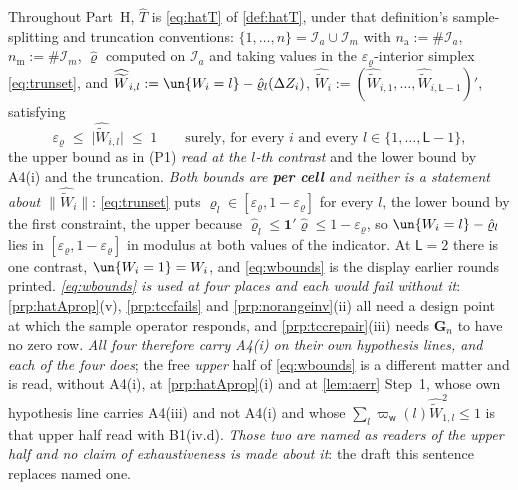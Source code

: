 \begin{definition}\label{def:hatTexp}
Throughout Part~H, $\hat T$ is \eqref{eq:hatT} of \cref{def:hatT}, under that definition's
sample-splitting and truncation conventions: $\{1,\dots,n\}=\mathcal I_a\cup\mathcal I_m$ with
$n_{\mathrm a}:=\#\mathcal I_a$, $n_{\mathrm m}:=\#\mathcal I_m$, $\hat\varrho$ computed on
$\mathcal I_a$ and taking values in the $\varepsilon_\varrho$-interior simplex \eqref{eq:trunset}, and
$\widehat{\widetilde W}_{i,l}:=\un\{W_i=l\}-\hat\varrho_l(\Delta Z_i)$,
$\widehat{\widetilde W}_i:=(\widehat{\widetilde W}_{i,1},\dots,\widehat{\widetilde W}_{i,\mathsf L-1})'$,
satisfying
\begin{equation}\label{eq:wbounds}
\varepsilon_\varrho\;\le\;\big|\widehat{\widetilde W}_{i,l}\big|\;\le\;1
\qquad\text{surely, for every }i\text{ and every }l\in\{1,\dots,\mathsf L-1\} ,
\end{equation}
the upper bound as in (P1) \emph{read at the $l$-th contrast} and the lower bound by A4(i) and the
truncation. \emph{Both bounds are \textbf{per cell} and neither is a statement about
$\|\widehat{\widetilde W}_i\|$}: \eqref{eq:trunset} puts $\hat\varrho_l\in[\varepsilon_\varrho,1-\varepsilon_\varrho]$
for every $l$, the lower bound by the first constraint, the upper because
$\hat\varrho_l\le\mathbf 1'\hat\varrho\le1-\varepsilon_\varrho$, so
$\un\{W_i=l\}-\hat\varrho_l$ lies in $[\varepsilon_\varrho,1-\varepsilon_\varrho]$ in modulus at both
values of the indicator. At $\mathsf L=2$ there is one contrast, $\un\{W_i=1\}=W_i$, and
\eqref{eq:wbounds} is the display earlier rounds printed.
\emph{\eqref{eq:wbounds} is used at four places and each would fail without it}: \cref{prp:hatAprop}(v),
\cref{prp:tccfails} and \cref{prp:norangeinv}(ii) all need a design point at which the sample operator
responds, and \cref{prp:tccrepair}\textup{(iii)} needs $\mathbf G_n$ to have no zero row. \emph{All four
therefore carry A4(i) on their own hypothesis lines, and each of the four does}; the free \emph{upper}
half of \eqref{eq:wbounds} is a different matter and is read, without A4(i), at \cref{prp:hatAprop}(i)
and at \cref{lem:aerr} Step~1, whose own hypothesis line carries A4(iii) and not A4(i) and whose
$\sum_l\varpi_{\mathsf w}(l)\widehat{\widetilde W}_{1,l}^{2}\le1$ is that upper half read with
B1(iv.d). \emph{Those two are named as readers of the upper half and no claim of exhaustiveness is
made about it}: the draft this sentence replaces named one.

\end{definition}
